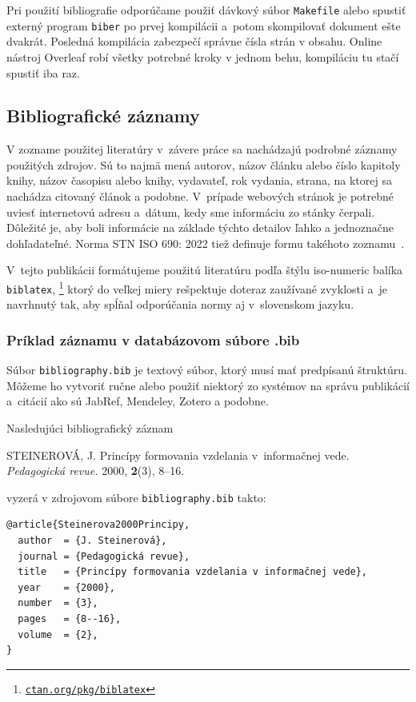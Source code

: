 Pri použití bibliografie odporúčame použiť dávkový súbor
\texttt{Makefile} alebo spustiť externý program \texttt{biber}
po prvej kompilácii a~potom skompilovať dokument ešte dvakrát.
Posledná kompilácia zabezpečí správne čísla strán v obsahu.
Online nástroj Overleaf robí všetky potrebné kroky v jednom behu,
kompiláciu tu stačí spustiť iba raz.

\subsection{Bibliografické záznamy}
V zozname použitej literatúry v~závere práce sa nachádzajú
podrobné záznamy použitých zdrojov.
Sú to najmä mená autorov, názov článku alebo číslo kapitoly
knihy, názov časopisu alebo knihy, vydavateľ, rok vydania,
strana, na ktorej sa nachádza citovaný článok a podobne.
V~prípade webových stránok je potrebné uviesť internetovú adresu
a~dátum, kedy sme informáciu zo stánky čerpali.
Dôležité je, aby boli informácie na základe týchto detailov
ľahko a jednoznačne dohľadateľné.
Norma STN ISO 690: 2022 tiež definuje formu takéhoto zoznamu~\cite{iso690}.

V~tejto publikácii formátujeme použitú literatúru
podľa štýlu iso-numeric \cite{Hoftich2022iso690} balíka \texttt{biblatex},
\footnote{\href{https://ctan.org/pkg/biblatex}{\texttt{ctan.org/pkg/biblatex}}}
ktorý do veľkej miery rešpektuje doteraz zaužívané zvyklosti
a~je navrhnutý tak,
aby spĺňal odporúčania normy aj v~slovenskom jazyku.

\subsubsection{Príklad záznamu v databázovom súbore .bib}\label{sec:citExample}
Súbor \texttt{bibliography.bib} je textový súbor, ktorý musí mať predpísanú štruktúru.
Môžeme ho vytvoriť ručne alebo použiť niektorý zo systémov na správu publikácií a~citácií ako sú JabRef, Mendeley, Zotero a podobne.

Nasledujúci bibliografický záznam
\begin{trivlist}
  \item STEINEROVÁ, J. Princípy formovania vzdelania
  v~informačnej vede. \textit{Pedagogická revue.} 2000, \textbf{2}(3), 8--16.
\end{trivlist}
vyzerá v zdrojovom súbore \texttt{bibliography.bib} takto:
\begin{verbatim}
@article{Steinerova2000Principy,
  author  = {J. Steinerová},
  journal = {Pedagogická revue},
  title   = {Princípy formovania vzdelania v informačnej vede},
  year    = {2000},
  number  = {3},
  pages   = {8--16},
  volume  = {2},
}
\end{verbatim}

